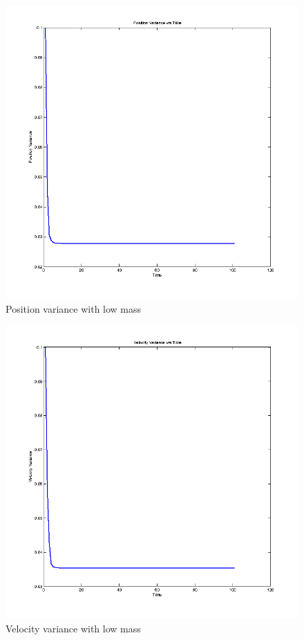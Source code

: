 \documentclass[12pt,english]{article}
\begin{document}
\begin{figure}
    \includegraphics[width=\linewidth]{kalman-variance1-m1}
    \caption{Position variance with low mass}
\end{figure}

\begin{figure}
    \includegraphics[width=\linewidth]{kalman-variance2-m1}
    \caption{Velocity variance with low mass}
\end{figure}
\end{document}
